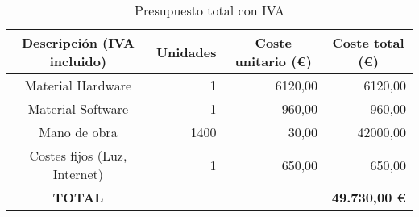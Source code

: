 \begin{table}[ht]
	\centering
	\begin{tabular}{|c|r|r|r|}
		\hline
		\rowcolor[HTML]{EFEFEF}
		\textbf{Descripción (IVA incluido)} & \multicolumn{1}{c|}{\cellcolor[HTML]{EFEFEF}\textbf{Unidades}}    & \multicolumn{1}{c|}{\cellcolor[HTML]{EFEFEF}\textbf{Coste unitario (€)}} & \multicolumn{1}{c|}{\cellcolor[HTML]{EFEFEF}\textbf{Coste total (€)}} \\ \hline
		Material Hardware                   & 1                                                                 & 6120,00                                                                  & 6120,00                                                               \\ \hline
		Material Software                   & 1                                                                 & 960,00                                                                   & 960,00                                                                \\ \hline
		Mano de obra                        & 1400                                                              & 30,00                                                                    & 42000,00                                                              \\ \hline
		Costes fijos (Luz, Internet)        & 1                                                                 & 650,00                                                                   & 650,00                                                                \\ \hline
		\rowcolor[HTML]{FFFFC7}
		\textbf{TOTAL}                      & \multicolumn{3}{r|}{\cellcolor[HTML]{FFFFC7}\textbf{49.730,00 €}}                                                                                                                                                    \\ \hline
	\end{tabular}
	\caption{Presupuesto total con IVA}
	\label{tab:budget}
\end{table}